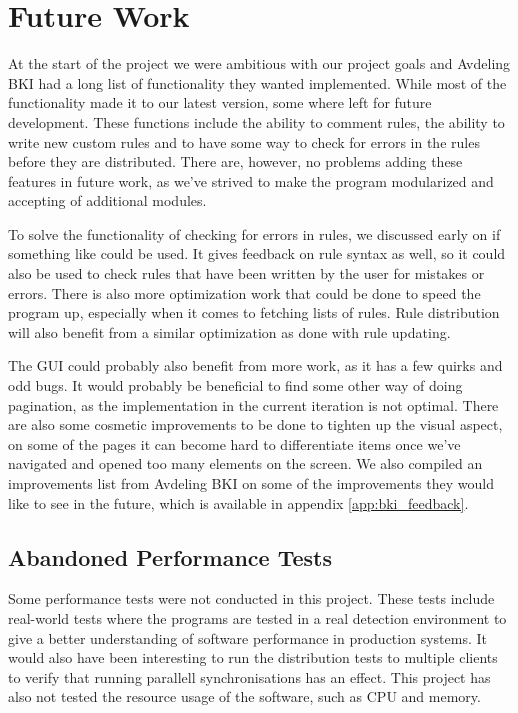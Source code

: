 \section{Future Work}
At the start of the project we were ambitious with our project goals and
Avdeling BKI had a long list of functionality they wanted implemented. While
most of the functionality made it to our latest version, some where left for
future development. These functions include the ability to comment rules, the
ability to write new custom rules and to have some way to check for errors in
the rules before they are distributed. There are, however, no problems adding
these features in future work, as we've strived to make the program modularized
and accepting of additional modules.

To solve the functionality of checking for errors in rules, we discussed early
on if something like \dumbpig{} \cite{dumbpig} could be used. It gives feedback
on rule syntax as well, so it could also be used to check rules that have been
written by the user for mistakes or errors. There is also more optimization work
that could be done to speed the program up, especially when it comes to fetching
lists of rules. Rule distribution will also benefit from a similar optimization
as done with rule updating.

The GUI could probably also benefit from more work, as it has a few quirks and
odd bugs. It would probably be beneficial to find some other way of doing
pagination, as the implementation in the current iteration is not optimal.
There are also some cosmetic improvements to be done to tighten up the visual
aspect, on some of the pages it can become hard to differentiate items once
we've navigated and opened too many elements on the screen. We also compiled an
improvements list from Avdeling BKI on some of the improvements they would like
to see in the future, which is available in appendix \ref{app:bki_feedback}.

\subsection{Abandoned Performance Tests}
Some performance tests were not conducted in this project. These tests include
real-world tests where the programs are tested in a real detection environment
to give a better understanding of software performance in production systems.
It would also have been interesting to run the distribution tests to multiple
clients to verify that running parallell synchronisations has
an effect. This project has also not tested the resource usage of the software,
such as CPU and memory.